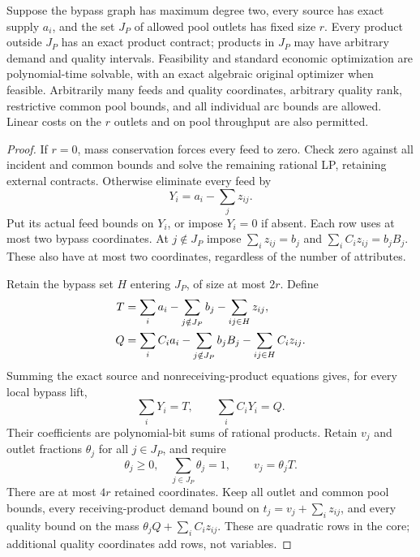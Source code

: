 \begin{theorem}\label{s5:fixed-products}
Suppose the bypass graph has maximum degree two, every source has exact
supply $a_i$, and the set $J_P$ of allowed pool outlets has fixed size
$r$. Every product outside $J_P$ has an exact product contract; products
in $J_P$ may have arbitrary demand and quality intervals. Feasibility
and standard economic optimization are polynomial-time solvable, with
an exact algebraic original optimizer when feasible. Arbitrarily many
feeds and quality coordinates, arbitrary quality rank, restrictive
common pool bounds, and all individual arc bounds are allowed. Linear
costs on the $r$ outlets and on pool throughput are also permitted.
\end{theorem}
\begin{proof}
If $r=0$, mass conservation forces every feed to zero. Check zero against
all incident and common bounds and solve the remaining rational LP,
retaining external contracts. Otherwise eliminate every feed by
\[
 Y_i=a_i-\sum_jz_{ij}.
\]
Put its actual feed bounds on $Y_i$, or impose $Y_i=0$ if absent. Each
row uses at most two bypass coordinates. At $j\notin J_P$ impose
$\sum_i z_{ij}=b_j$ and $\sum_i C_i z_{ij}=b_jB_j$. These also have
at most two coordinates, regardless of the number of attributes.

Retain the bypass set $H$ entering $J_P$, of size at most $2r$. Define
\begin{align}
 T&=\sum_i a_i-\sum_{j\notin J_P}b_j-\sum_{ij\in H}z_{ij},\notag\\
 Q&=\sum_i C_i a_i-\sum_{j\notin J_P}b_jB_j
                         -\sum_{ij\in H}C_i z_{ij}.
 \label{s5:boundary-masses}
\end{align}
Summing the exact source and nonreceiving-product equations gives,
for every local bypass lift,
\begin{equation}
 \sum_iY_i=T,\qquad \sum_i C_iY_i=Q.
 \label{s5:boundary-identities}
\end{equation}
Their coefficients are polynomial-bit sums of rational products.
Retain $v_j$ and outlet fractions $\theta_j$ for all $j\in J_P$, and
require
\[
 \theta_j\ge0,\quad\sum_{j\in J_P}\theta_j=1,\qquad
 v_j=\theta_jT.
\]
There are at most $4r$ retained coordinates. Keep all outlet and common
pool bounds, every receiving-product demand bound on
$t_j=v_j+\sum_i z_{ij}$, and every quality bound on the mass
$\theta_jQ+\sum_i C_i z_{ij}$. These are quadratic rows in the core;
additional quality coordinates add rows, not variables.


\end{proof}
